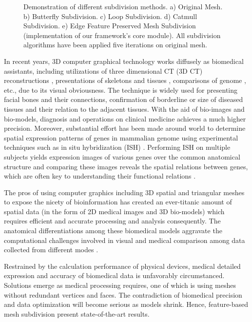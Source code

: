 \documentclass[10pt, conference, compsocconf]{IEEEtran}
\begin{document}
\begin{figure}[htb]
  \caption{Demonstration of different subdivision methods. a) Original Mesh. b) Butterfly Subdivision. c) Loop Subdivision. d) Catmull Subdivision. e) Edge Feature Preserved Mesh Subdivision (implementation of our framework's core module). All subdivision algorithms have been applied five iterations on original mesh.}\label{Figure_EFPMS}
\end{figure}

In recent years, 3D computer graphical technology works diffusely as biomedical assistants, including utilizations of three dimensional CT (3D CT) reconstructions \cite{Choi2016Acceleration,koopman2016small,Muthusami2017CT,Mccann2016Fast}, presentations of skeletons and tissues \cite{Tao1999Application}, comparisons of genome \cite{Lein2007Genome,Bonev2016Organization,Tjong2016Population,Caspermeyer2017Principles}, etc., due to its visual obviousness. The technique is widely used for presenting facial bones and their connections, confirmation of borderline or size of diseased tissues and their relation to the adjacent tissues. With the aid of bio-images and bio-models, diagnosis and operations on clinical medicine achieves a much higher precision. Moreover, substantial effort has been made around world to determine spatial expression patterns of genes in mammalian genome using experimental techniques such as in situ hybridization (ISH) \cite{Carson2002A}. Performing ISH on multiple subjects yields expression images of various genes over the common anatomical structure and comparing these images reveals the spatial relations between genes, which are often key to understanding their functional relations \cite{Ju2003A,Schaefer2004Smooth}.

The pros of using computer graphics including 3D spatial and triangular meshes \cite{B2014Interactive,Guskov2014Non,Zhang2015A} to expose the nicety of bioinformation has created an ever-titanic amount of spatial data (in the form of 2D medical images and 3D bio-models) which requires efficient and accurate processing and analysis consequently. The anatomical differentiations among these biomedical models aggravate the computational challenges involved in visual and medical comparison among data collected from different modes \cite{Tao2010Subdivision}.

Restrained by the calculation performance of physical devices, medical detailed expression and accuracy of biomedical data
is unfavorably circumstanced. Solutions emerge as medical processing requires, one of which is using meshes without redundant vertices and faces. The contradiction of biomedical precision and data optimization will become serious as models shrink. Hence, feature-based mesh subdivision present state-of-the-art results\cite{Tao2010Subdivision}.
\end{document}
